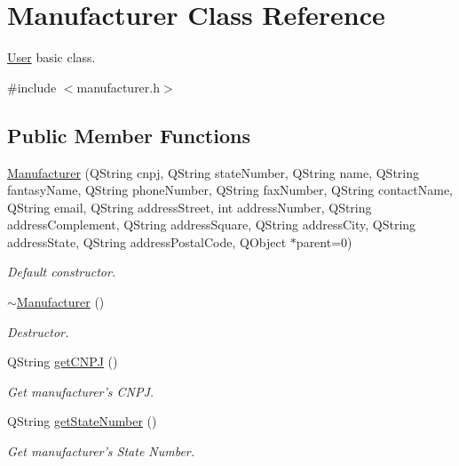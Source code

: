 \hypertarget{class_manufacturer}{\section{\-Manufacturer \-Class \-Reference}
\label{class_manufacturer}
}


\hyperlink{class_user}{\-User} basic class.  




{\ttfamily \#include $<$manufacturer.\-h$>$}

\subsection*{\-Public \-Member \-Functions}
\begin{DoxyCompactItemize}
\item 
\hyperlink{class_manufacturer_ab0e565c15ade4cfbf21011976426b017}{\-Manufacturer} (\-Q\-String cnpj, \-Q\-String state\-Number, \-Q\-String name, \-Q\-String fantasy\-Name, \-Q\-String phone\-Number, \-Q\-String fax\-Number, \-Q\-String contact\-Name, \-Q\-String email, \-Q\-String address\-Street, int address\-Number, \-Q\-String address\-Complement, \-Q\-String address\-Square, \-Q\-String address\-City, \-Q\-String address\-State, \-Q\-String address\-Postal\-Code, \-Q\-Object $\ast$parent=0)
\begin{DoxyCompactList}\small\item\em \-Default constructor. \end{DoxyCompactList}\item 
\hyperlink{class_manufacturer_a44e41698883a430e71de204d72c733d6}{$\sim$\-Manufacturer} ()
\begin{DoxyCompactList}\small\item\em \-Destructor. \end{DoxyCompactList}\item 
\-Q\-String \hyperlink{class_manufacturer_a94e0c7908f8a5727cf0e3f9059dab402}{get\-C\-N\-P\-J} ()
\begin{DoxyCompactList}\small\item\em \-Get manufacturer's \-C\-N\-P\-J. \end{DoxyCompactList}\item 
\-Q\-String \hyperlink{class_manufacturer_aa3eddefda0f130cb847b04006561e5d5}{get\-State\-Number} ()
\begin{DoxyCompactList}\small\item\em \-Get manufacturer's \-State \-Number. \end{DoxyCompactList}\item 

\end{DoxyCompactItemize}
